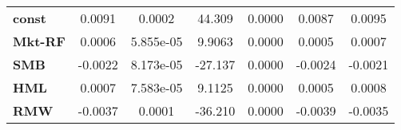 \begin{center}
\begin{tabular}{lcccccc}
\midrule
\textbf{const}  &       0.0091       &       0.0002       &      44.309     &      0.0000      &       0.0087      &       0.0095       \\
\textbf{Mkt-RF} &       0.0006       &     5.855e-05      &      9.9063     &      0.0000      &       0.0005      &       0.0007       \\
\textbf{SMB}    &      -0.0022       &     8.173e-05      &     -27.137     &      0.0000      &      -0.0024      &      -0.0021       \\
\textbf{HML}    &       0.0007       &     7.583e-05      &      9.1125     &      0.0000      &       0.0005      &       0.0008       \\
\textbf{RMW}    &      -0.0037       &       0.0001       &     -36.210     &      0.0000      &      -0.0039      &      -0.0035       \\
\bottomrule
\end{tabular}
\end{center}
